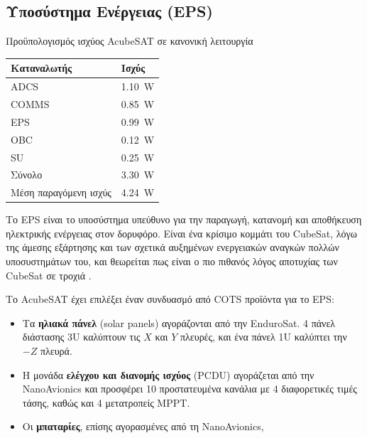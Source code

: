 \documentclass[a4paper,nobib]{tufte-book}
\begin{document}
\subsection{Υποσύστημα Ενέργειας (\acs{EPS})}

\begin{margintable}
	\caption{Προϋπολογισμός ισχύος AcubeSAT σε κανονική λειτουργία}
	\label{tab:power_budget}
	\begin{tabularx}{\linewidth}{@{}lX@{}}
		\toprule
		\textbf{Καταναλωτής}            & \textbf{Ισχύς}            \\ \midrule
		\acs{ADCS}          & \SI{1.10}{\watt} \\
		\acs{COMMS}         & \SI{0.85}{\watt} \\
		\acs{EPS}           & \SI{0.99}{\watt} \\
		\acs{OBC}           & \SI{0.12}{\watt} \\
		\acs{SU}            & \SI{0.25}{\watt} \\ \midrule
		Σύνολο               & \SI{3.30}{\watt} \\
		Μέση παραγόμενη ισχύς & \SI{4.24}{\watt} \\ \bottomrule
	\end{tabularx}
\end{margintable}

Το \ac{EPS} είναι το υποσύστημα υπεύθυνο για την παραγωγή, κατανομή και αποθήκευση ηλεκτρικής ενέργειας στον δορυφόρο. Είναι ένα κρίσιμο κομμάτι του CubeSat, λόγω της άμεσης εξάρτησης και των σχετικά αυξημένων ενεργειακών αναγκών πολλών υποσυστημάτων του, και θεωρείται πως είναι ο πιο πιθανός λόγος αποτυχίας των CubeSat σε τροχιά \autocite{langer_reliability_cubesats_2016}.

Το AcubeSAT έχει επιλέξει έναν συνδυασμό από \ac{COTS} προϊόντα για το \ac{EPS}: \autocite{DDJF_SYS}
\begin{itemize}
	\item Τα \textbf{ηλιακά πάνελ} (solar panels) αγοράζονται από την EnduroSat. 4 πάνελ διάστασης 3U καλύπτουν τις \(X\) και \(Y\) πλευρές, και ένα πάνελ 1U καλύπτει την \(-Z\) πλευρά.
	\item Η μονάδα \textbf{ελέγχου και διανομής ισχύος} (\acs{PCDU}) αγοράζεται από την NanoAvionics και προσφέρει 10 προστατευμένα κανάλια με 4 διαφορετικές τιμές τάσης, καθώς και 4 μετατροπείς \acs{MPPT}.
	\item Οι \textbf{μπαταρίες}, επίσης αγορασμένες από τη NanoAvionics, 
\end{itemize}
\end{document}
